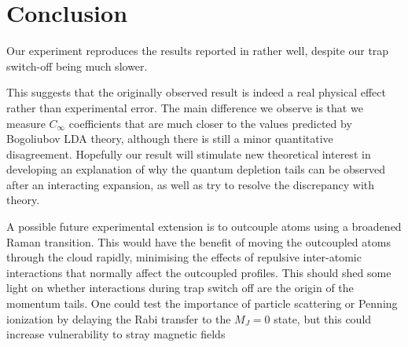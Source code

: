 \documentclass[%
	 aps,%
	 prl,%
	 a4paper,%
	 amsmath,amssymb,%
	 preprint,%
	 reprint,%
]{revtex4-1}
\begin{document}
\section{Conclusion}


Our experiment reproduces the results reported in \cite{Chang2016} rather well, despite our trap switch-off being much slower. %

This suggests that the originally observed result is indeed a real physical effect rather than experimental error.   The main difference we observe is that we measure $C_\infty$ coefficients that are much closer to the values predicted by Bogoliubov LDA theory, although there is still a minor quantitative disagreement. Hopefully our result will stimulate new theoretical interest in developing an explanation of why the quantum depletion tails can be observed after an interacting expansion, as well as try to resolve the discrepancy with theory.  

A possible future experimental extension is to outcouple atoms using a broadened Raman transition.  This would have the benefit of moving the outcoupled atoms through the cloud rapidly, minimising the effects of repulsive inter-atomic interactions that normally affect the outcoupled profiles.  This should shed some light on whether interactions during trap switch off are the origin of the momentum tails. One could test the importance of particle scattering or Penning ionization by delaying the Rabi transfer to the $M_J = 0$ state, but this could increase vulnerability to stray magnetic fields %







%
%
%
%
%
\end{document}
